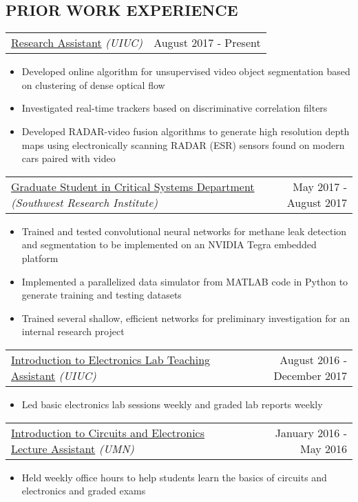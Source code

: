 \documentclass[10pt, letterpaper]{article}
\makeatletter
\newcommand{\headerrow}[2]
{\begin{tabular*}{\linewidth}{l@{\extracolsep{\fill}}r}
	#1 &
	#2 \\
\end{tabular*}}
\newcommand{\sansserif}{\cabin}
\makeatother
\begin{document}
\subsection*{\sansserif PRIOR WORK EXPERIENCE}

\headerrow
	{\uline{Research Assistant} \textit{(UIUC)}}
	{August 2017 - Present}
	\begin{itemize}
		\item Developed online algorithm for unsupervised video object segmentation based on clustering of dense optical flow
		\item Investigated real-time trackers based on discriminative correlation filters
        \item Developed RADAR-video fusion algorithms to generate high
resolution depth maps using electronically scanning RADAR (ESR) sensors found on
modern cars paired with video
	\end{itemize}

\headerrow
	{\uline{Graduate Student in Critical Systems Department} \textit{(Southwest Research Institute)}}
	{May 2017 - August 2017}
	\begin{itemize}
		\item Trained and tested convolutional neural networks for methane leak detection and segmentation to be implemented on an NVIDIA Tegra embedded platform
		\item Implemented a parallelized data simulator from MATLAB code in Python to generate training and testing datasets
		\item Trained several shallow, efficient networks for preliminary investigation for an internal research project
	\end{itemize}

\headerrow
	{\uline{Introduction to Electronics Lab Teaching Assistant} \textit{(UIUC)}}
	{August 2016 - December 2017}
	\begin{itemize}
		\item Led basic electronics lab sessions weekly and graded lab reports weekly
	\end{itemize}

\headerrow
	{\uline{Introduction to Circuits and Electronics Lecture Assistant} \textit{(UMN)}}
	{January 2016 - May 2016}
	\begin{itemize}
		\item Held weekly office hours to help students learn the basics of circuits and electronics and graded exams
	\end{itemize}
\end{document}
